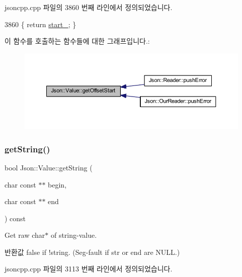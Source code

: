 jsoncpp.\+cpp 파일의 3860 번째 라인에서 정의되었습니다.


\begin{DoxyCode}
3860 \{ \textcolor{keywordflow}{return} \hyperlink{class_json_1_1_value_a1c3aeb0fa8fefe93776cb347c76a25a8}{start\_}; \}
\end{DoxyCode}
이 함수를 호출하는 함수들에 대한 그래프입니다.\+:\nopagebreak
\begin{figure}[H]
\begin{center}
\leavevmode
\includegraphics[width=350pt]{class_json_1_1_value_afa081dc764000951a1d8d6148155508e_icgraph}
\end{center}
\end{figure}
\mbox{\label{class_json_1_1_value_a2e1b7be6bde2fe23f15290d9ddbbdf8a}} 
\subsubsection{\texorpdfstring{get\+String()}{getString()}}
{\footnotesize\ttfamily bool Json\+::\+Value\+::get\+String (\begin{DoxyParamCaption}\item[{char const $\ast$$\ast$}]{begin,  }\item[{char const $\ast$$\ast$}]{end }\end{DoxyParamCaption}) const}

Get raw char$\ast$ of string-\/value. \begin{DoxyReturn}{반환값}
false if !string. (Seg-\/fault if str or end are N\+U\+LL.) 
\end{DoxyReturn}


jsoncpp.\+cpp 파일의 3113 번째 라인에서 정의되었습니다.


